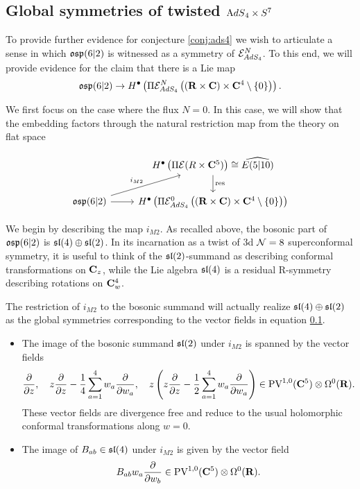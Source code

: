 \documentclass[../main.tex]{subfiles}
\begin{document}
\subsection{Global symmetries of twisted ${\mathrm{A}dS}_4 \times S^7$}

To provide further evidence for conjecture \ref{conj:ads4} we wish to articulate a sense in which $\mathfrak{osp}(6|2)$ is witnessed as a symmetry of $\mathcal{E}^N_{AdS_4}$. To this end, we will provide evidence for the claim that there is a Lie map 
\[\mathfrak{osp}(6|2)\to H^\bullet \left ( \Pi \mathcal{E}^N_{AdS_4} \left ( (\mathbf{R}\times \mathbf{C}) \times \mathbf{C}^4\setminus \{0\} \right ) \right ).\]

We first focus on the case where the flux $N=0$. In this case, we will show that the embedding factors through the natural restriction map from the theory on flat space

\[ 
\begin{tikzcd}
& H^\bullet \left ( \Pi \mc E (R\times \C^5)\right )\cong\widehat{E(5|10) }\ar[d, "\mr{res}"] \\
\mf{osp}(6|2)\ar[ur, "i_{M2}"]\ar[r] & H^\bullet \left ( \Pi \mc E^0_{AdS_4} \left ( (\R\times \C) \times \C^4\setminus \{0\} \right ) \right )
\end{tikzcd}
\]
\parsec[] 

We begin by describing the map $i_{M2}$. As recalled above, the bosonic part of $\mathfrak{osp}(6|2)$ is $\mathfrak{sl}(4)\oplus \mathfrak{sl}(2)$. In its incarnation as a twist of 3d $\mathcal{N}=8$ superconformal symmetry, it is useful to think of the $\mathfrak{sl}(2)$-summand as describing conformal transformations on $\mathbf{C}_z$, while the Lie algebra $\mathfrak{sl}(4)$ is a residual R-symmetry describing rotations on $\mathbf{C}^4_w$.

The restriction of $i_{M2}$ to the bosonic summand will actually realize $\mathfrak{sl}(4)\oplus \mathfrak{sl}(2)$ as the global symmetries corresponding to the vector fields in equation \ref{}.
\begin{itemize}
\item The image of the bosonic summand $\mathfrak{sl}(2)$ under $i_{M2}$ is spanned by the vector fields
\[
\frac{\partial}{\partial z} ,\quad z \frac{\partial}{\partial z} - \frac14 \sum_{a=1}^4 w_a \frac{\partial}{\partial w_a} , \quad z \left(z \frac{\partial}{\partial z} - \frac12 \sum_{a=1}^4 w_a \frac{\partial}{\partial w_a} \right) \in \text{PV}^{1,0}(\mathbf{C}^5) \otimes \Omega^0(\mathbf{R}).
\]
These vector fields are divergence free and reduce to the usual holomorphic conformal transformations along $w=0$.
\item The image of $B_{ab}\in \mathfrak{sl}(4)$ under $i_{M2}$ is given by the vector field
\[
B_{ab} w_a \frac{\partial}{\partial w_b} \in \text{PV}^{1,0}(\mathbf{C}^5) \otimes \Omega^0(\mathbf{R}).
\]
\end{itemize}
\end{document}
